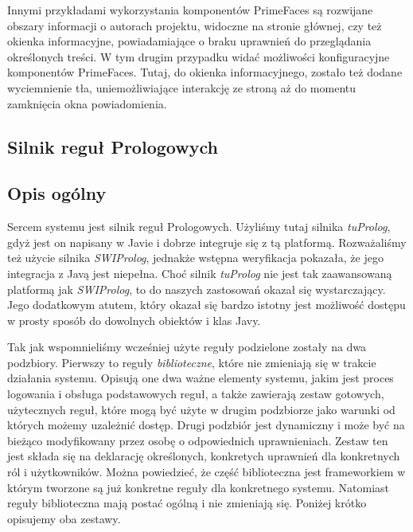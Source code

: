 \documentclass{classrep}
\begin{document}
Innymi przykładami wykorzystania komponentów PrimeFaces są rozwijane obszary informacji o autorach projektu, widoczne na stronie głównej, czy też okienka informacyjne, powiadamiające o braku uprawnień do przeglądania określonych treści. W tym drugim przypadku widać możliwości konfiguracyjne komponentów PrimeFaces. Tutaj, do okienka informacyjnego, zostało też dodane wyciemnienie tła, uniemożliwiające interakcję ze stroną aż do momentu zamknięcia okna powiadomienia.

\subsection{Silnik reguł Prologowych}

\subsection{Opis ogólny}

Sercem systemu jest silnik reguł Prologowych. Użyliśmy tutaj silnika \textsl{tuProlog}, gdyż jest on napisany w Javie i dobrze integruje się z tą platformą. Rozważaliśmy też
użycie silnika \textsl{SWIProlog}, jednakże wstępna weryfikacja pokazała, że jego integracja z Javą jest niepełna. Choć silnik \textsl{tuProlog} nie jest tak zaawansowaną platformą jak
\textsl{SWIProlog}, to do naszych zastosowań okazał się wystarczający. Jego dodatkowym atutem, który okazał się bardzo istotny jest możliwość dostępu w prosty sposób do dowolnych
obiektów i klas Javy.

Tak jak wspomnieliśmy wcześniej użyte reguły podzielone zostały na dwa podzbiory. Pierwszy to reguły \textit{biblioteczne}, które nie zmieniają się w trakcie działania systemu.
Opisują one dwa ważne elementy systemu, jakim jest proces logowania i obsługa podstawowych reguł, a także zawierają zestaw gotowych, użytecznych reguł, które mogą być użyte w drugim
podzbiorze jako warunki od których możemy uzależnić dostęp. Drugi podzbiór jest dynamiczny i może być na bieżąco modyfikowany przez osobę o odpowiednich uprawnieniach. Zestaw ten
jest składa się na deklarację określonych, konkretych uprawnień dla konkretnych ról i użytkowników. Można powiedzieć, że część biblioteczna jest frameworkiem w którym tworzone są już
konkretne reguły dla konkretnego systemu. Natomiast reguły biblioteczna mają postać ogólną i nie zmieniają się. Poniżej krótko opisujemy oba zestawy.
\end{document}
